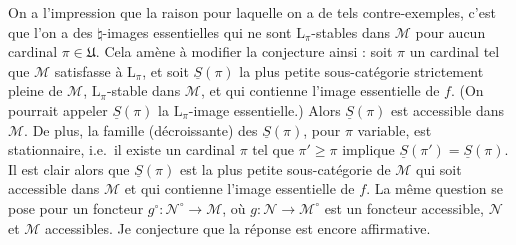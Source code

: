 On a l'impression que la raison pour laquelle on a de tels contre-exemples, c'est que l'on a des $\natural$-images essentielles qui ne sont $\mathrm{L}_\pi$-stables dans $\mathcal{M}$ pour aucun cardinal $\pi \in \mathfrak{U}$. Cela amène à modifier la conjecture ainsi : soit $\pi$ un cardinal tel que $\mathcal{M}$ satisfasse à $\mathrm{L}_\pi$,
et soit $\underline{S}(\pi)$ la plus petite sous-catégorie strictement pleine de $\mathcal{M}$, $\mathrm{L}_\pi$-stable dans $\mathcal{M}$, et qui contienne l'image essentielle de $f$. (On pourrait appeler $\underline{S}(\pi)$ la $\mathrm{L}_\pi$-image essentielle.) Alors $\underline{S}(\pi)$ est accessible dans $\mathcal{M}$. De plus, la famille (décroissante) des $\underline{S}(\pi)$, pour $\pi$ variable, est stationnaire, i.e.\ il existe un cardinal $\pi$ tel que $\pi' \geqslant \pi$ implique $\underline{S}(\pi') = \underline{S}(\pi)$. Il est clair alors que $\underline{S}(\pi)$ est la plus petite sous-catégorie de $\mathcal{M}$ qui soit accessible dans $\mathcal{M}$ et qui contienne l'image essentielle de $f$. La même question se pose pour un foncteur $g^\circ : \mathcal{N}^\circ \longrightarrow \mathcal{M}$, où $g : \mathcal{N} \longrightarrow \mathcal{M}^\circ$ est un foncteur accessible, $\mathcal{N}$ et $\mathcal{M}$ accessibles. Je conjecture que la réponse est encore affirmative.


